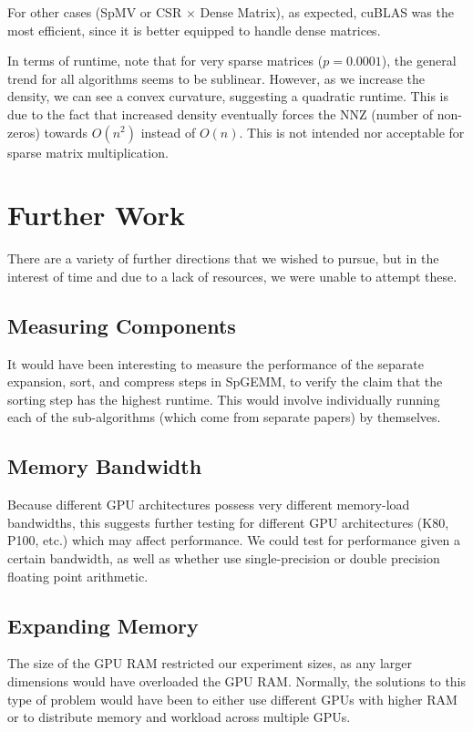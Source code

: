 \documentclass[12pt]{article}
\begin{document}
\hspace{0.5cm}For other cases (SpMV or CSR $\times$ Dense Matrix), as expected, cuBLAS was the most efficient, since it is better equipped to handle dense matrices.

\hspace{0.5cm}In terms of runtime, note that for very sparse matrices ($p = 0.0001$), the general trend for all algorithms seems to be sublinear. However, as we increase the density, we can see a convex curvature, suggesting a quadratic runtime. This is due to the fact that increased density eventually forces the NNZ (number of non-zeros) towards $O(n^{2})$ instead of $O(n)$. This is not intended nor acceptable for sparse matrix multiplication. 

\section{Further Work}
\hspace{0.5cm}There are a variety of further directions that we wished to pursue, but in the interest of time and due to a lack of resources, we were unable to attempt these.
\subsection{Measuring Components}
\hspace{0.5cm}It would have been interesting to measure the performance of the separate expansion, sort, and compress steps in SpGEMM, to verify the claim that the sorting step has the highest runtime. This would involve individually running each of the sub-algorithms (which come from separate papers) by themselves.

\subsection{Memory Bandwidth}
\hspace{0.5cm}Because different GPU architectures possess very different memory-load bandwidths, this suggests further testing for different GPU architectures (K80, P100, etc.) which may affect performance. We could test for performance given a certain bandwidth, as well as whether use single-precision or double precision floating point arithmetic. 

\subsection{Expanding Memory}
\hspace{0.5cm}The size of the GPU RAM restricted our experiment sizes, as any larger dimensions would have overloaded the GPU RAM. Normally, the solutions to this type of problem would have been to either use different GPUs with higher RAM or to distribute memory and workload across multiple GPUs.
\end{document}
